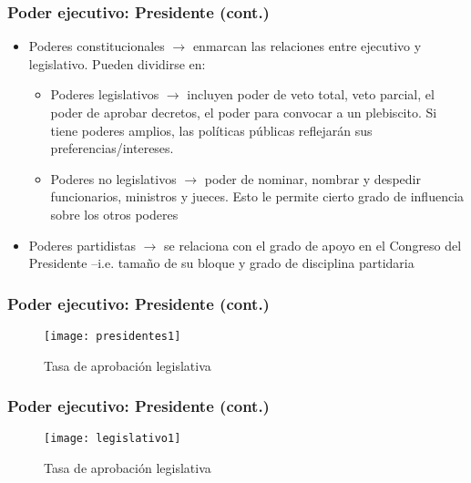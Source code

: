 \documentclass[14pt,aspectratio=169]{beamer}
\begin{document}
\begin{frame}\frametitle{Poder ejecutivo: Presidente (cont.)}
  \begin{itemize}
  \item Poderes constitucionales $\longrightarrow$ enmarcan las
    relaciones entre ejecutivo y legislativo. Pueden dividirse en:
    \begin{itemize}
    \item Poderes legislativos $\longrightarrow$ incluyen poder de
      veto total, veto parcial, el poder de aprobar decretos, el poder
      para convocar a un plebiscito. Si tiene poderes amplios, las
      políticas públicas reflejarán sus preferencias/intereses.
      \item Poderes no legislativos $\longrightarrow$ poder de
       nominar, nombrar y despedir funcionarios, ministros y
       jueces. Esto le permite cierto grado de influencia sobre los
       otros poderes
      \end{itemize}
   \item Poderes partidistas $\longrightarrow$ se relaciona con el
     grado de apoyo en el Congreso del Presidente --i.e. tamaño de su
     bloque y grado de disciplina partidaria
    \end{itemize}
  \end{frame}



\begin{frame}\frametitle{Poder ejecutivo: Presidente (cont.)}
 \begin{figure}[htbp]\vspace{0cm}
    \centering
    \texttt{[image: presidentes1]}
    \caption{Tasa de aprobación legislativa}
    \label{fig:1}
  \end{figure}
        \end{frame}

  
  
\begin{frame}\frametitle{Poder ejecutivo: Presidente (cont.)}
 \begin{figure}[htbp]\vspace{0cm}
    \centering
    \texttt{[image: legislativo1]}
    \caption{Tasa de aprobación legislativa}
    \label{fig:1}
  \end{figure}
        \end{frame}
\end{document}
